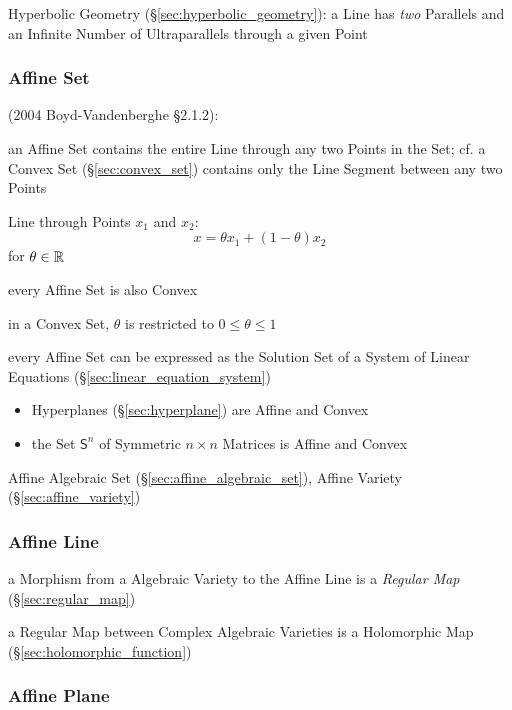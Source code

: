 \fist Hyperbolic Geometry (\S\ref{sec:hyperbolic_geometry}): a Line has
\emph{two} Parallels and an Infinite Number of Ultraparallels through a
given Point



\subsubsection{Affine Set}\label{sec:affine_set}

(2004 Boyd-Vandenberghe \S2.1.2):

an Affine Set contains the entire Line through any two Points in the Set; cf. a
Convex Set (\S\ref{sec:convex_set}) contains only the Line Segment between any
two Points

Line through Points $x_1$ and $x_2$:
\[
  x = \theta x_1 + (1-\theta) x_2
\]
for $\theta \in \mathbb{R}$

every Affine Set is also Convex

\fist in a Convex Set, $\theta$ is restricted to $0 \leq \theta \leq 1$

every Affine Set can be expressed as the Solution Set of a System of Linear
Equations (\S\ref{sec:linear_equation_system})

\begin{itemize}
  \item Hyperplanes (\S\ref{sec:hyperplane}) are Affine and Convex
  \item the Set $\mathsf{S}^n$ of Symmetric $n \times n$ Matrices is Affine and
    Convex
\end{itemize}

\fist Affine Algebraic Set (\S\ref{sec:affine_algebraic_set}), Affine Variety
(\S\ref{sec:affine_variety})



\subsubsection{Affine Line}\label{sec:affine_line}

a Morphism from a Algebraic Variety to the Affine Line is a \emph{Regular Map}
(\S\ref{sec:regular_map})

a Regular Map between Complex Algebraic Varieties is a Holomorphic Map
(\S\ref{sec:holomorphic_function})



\subsubsection{Affine Plane}\label{sec:affine_plane}

